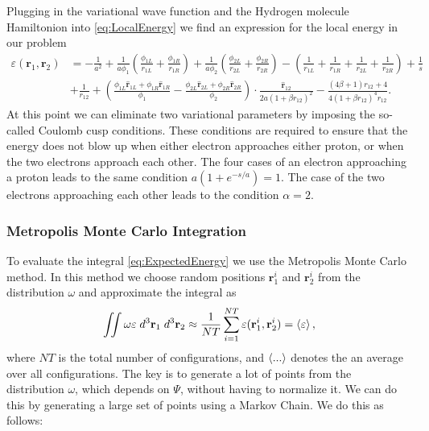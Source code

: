 \documentclass[twoside]{article}
\newcommand{\bfr}{\ensuremath{\mathbf{r}}}
\begin{document}
Plugging in the variational wave function and the Hydrogen molecule Hamiltonion into \eqref{eq:LocalEnergy} we find an expression for the local energy in our problem
\begin{equation}
\begin{split}
\varepsilon(\bfr_1,\bfr_2) &= 
-\frac{1}{a^2} 
+ \frac{1}{a\phi_1} \left(\frac{\phi_{1L}}{r_{1L}} + \frac{\phi_{1R}}{r_{1R}}\right) 
+ \frac{1}{a\phi_2} \left(\frac{\phi_{2L}}{r_{2L}} + \frac{\phi_{2R}}{r_{2R}}\right)
- \left( \frac{1}{r_{1L}}+\frac{1}{r_{1R}}+\frac{1}{r_{2L}}+\frac{1}{r_{2R}} \right) + \frac{1}{s} \\
&+ \frac{1}{r_{12}} 
+ \left( \frac{\phi_{1L}\hat{\bfr}_{1L} + \phi_{1R}\hat{\bfr}_{1R}}{\phi_1} - \frac{\phi_{2L}\hat{\bfr}_{2L} + \phi_{2R}\hat{\bfr}_{2R}}{\phi_2} \right) \cdot \frac{\hat{\bfr}_{12}}{2a(1+\beta r_{12})^2} 
- \frac{(4\beta+1)r_{12}+4}{4(1+\beta r_{12})^4 r_{12}}. 
\end{split}
\end{equation}
At this point we can eliminate two variational parameters by imposing the so-called Coulomb cusp conditions. These conditions are required to ensure that the energy does not blow up when either electron approaches either proton, or when the two electrons approach each other. The four cases of an electron approaching a proton leads to the same condition $a(1+e^{-s/a}) = 1$. The case of the two electrons approaching each other leads to the condition $\alpha = 2$.

\subsubsection*{Metropolis Monte Carlo Integration}
To evaluate the integral \eqref{eq:ExpectedEnergy} we use the Metropolis Monte Carlo method. In this method we choose random positions $\bfr_1^i$ and $\bfr_2^i$ from the distribution $\omega$ and approximate the integral as
\begin{equation}
\iint \omega \varepsilon \; d^3\bfr_1 \; d^3\bfr_2 \approx \frac{1}{NT} \sum_{i=1}^{NT} \varepsilon(\bfr_1^i,\bfr_2^i) = \braket{\varepsilon},
\end{equation}
where $NT$ is the total number of configurations, and $\braket{...}$ denotes the an average over all configurations. The key is to generate a lot of points from the distribution $\omega$, which depends on $\Psi$, without having to normalize it. We can do this by generating a large set of points using a Markov Chain. We do this as follows:
\end{document}
